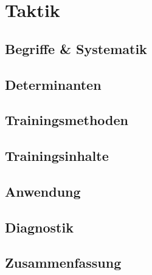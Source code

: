 \section{Taktik}

\subsection{Begriffe \& Systematik}

\subsection{Determinanten}

\subsection{Trainingsmethoden}

\subsection{Trainingsinhalte}

\subsection{Anwendung}

\subsection{Diagnostik}

\subsection{Zusammenfassung}
